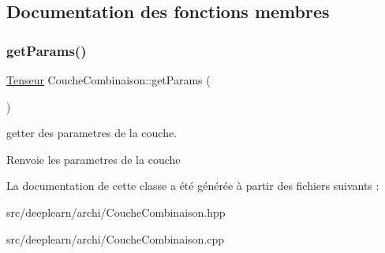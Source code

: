 \subsection{Documentation des fonctions membres}
\mbox{\label{classCoucheCombinaison_a49d595f069641090c8fbbdff025db259}} 
\subsubsection{\texorpdfstring{get\+Params()}{getParams()}}
{\footnotesize\ttfamily \hyperlink{classTenseur}{Tenseur} Couche\+Combinaison\+::get\+Params (\begin{DoxyParamCaption}{ }\end{DoxyParamCaption})}



getter des parametres de la couche. 

\begin{DoxyReturn}{Renvoie}
les parametres de la couche 
\end{DoxyReturn}


La documentation de cette classe a été générée à partir des fichiers suivants \+:\begin{DoxyCompactItemize}
\item 
src/deeplearn/archi/Couche\+Combinaison.\+hpp\item 
src/deeplearn/archi/Couche\+Combinaison.\+cpp\end{DoxyCompactItemize}
